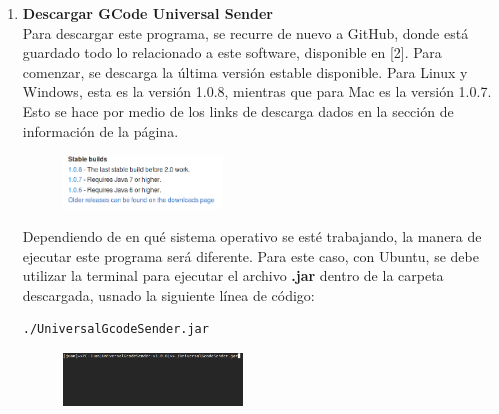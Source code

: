 \documentclass{article}
\begin{document}
\begin{multicols}{2}
\begin{enumerate}
\item \textbf{Descargar GCode Universal Sender}\\
Para descargar este programa, se recurre de nuevo a GitHub, donde está guardado todo lo relacionado a este software, disponible en [2]. Para comenzar, se descarga la última versión estable disponible. Para Linux y Windows, esta es la versión 1.0.8, mientras que para Mac es la versión 1.0.7. Esto se hace por medio de los links de descarga dados en la sección de información de la página.

\begin{figure}[H]
\centering
\includegraphics[width=0.4\textwidth]{GCode.png}
\label{fig:Carpeta}
\end{figure}

Dependiendo de en qué sistema operativo se esté trabajando, la manera de ejecutar este programa será diferente. Para este caso, con Ubuntu, se debe utilizar la terminal para ejecutar el archivo \textbf{.jar} dentro de la carpeta descargada, usnado la siguiente línea de código:
\begin{lstlisting}
./UniversalGcodeSender.jar
\end{lstlisting}

\begin{figure}[H]
\centering
\includegraphics[width=0.45\textwidth]{Sender.png}
\label{fig:Carpeta}
\end{figure}
 

\end{enumerate}
\end{multicols}
\end{document}
